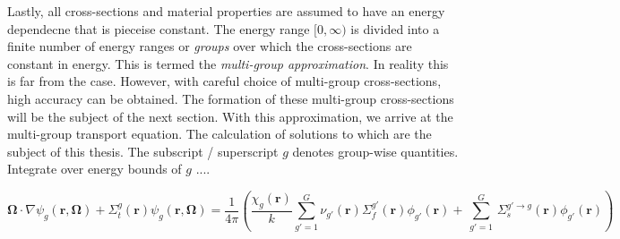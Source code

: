Lastly, all cross-sections and material properties are assumed to have an energy dependecne that is pieceise constant. The energy range $[0, \infty)$ is divided into a finite number of energy ranges or \textit{groups} over which the cross-sections are constant in energy. This is termed the 
\textit{multi-group approximation}. In reality this is far from the case. However, with careful choice of multi-group cross-sections, high accuracy can be obtained. The formation of these multi-group cross-sections will be the subject of the next section. With this approximation, we arrive at the multi-group transport equation. The calculation of solutions to which are the subject of this thesis. The subscript / superscript $g$ denotes group-wise quantities. Integrate over energy bounds of $g$ ....


\begin{equation}
\mathbf{\Omega} \cdot \nabla \psi_{g}(\mathbf{r},\mathbf{\Omega}) + \Sigma_t^{g}(\mathbf{r}) \psi_{g}(\mathbf{r},\mathbf{\Omega}) = \frac{1}{4 \pi} \left( \frac{\chi_{g}\left(\mathbf{r}\right)}{k} \sum_{g'=1}^{G} \nu_{g'}\left(\mathbf{r}\right) \Sigma_f^{g'}\left(\mathbf{r}\right) \phi_{g'}\left(\mathbf{r}\right) + \, \sum_{g'=1}^G \,  \Sigma_{s}^{g' \rightarrow g}\left(\mathbf{r}\right) \phi_{g'}(\mathbf{r}) \right)
\label{eqn:multi-group-transport}
\end{equation}